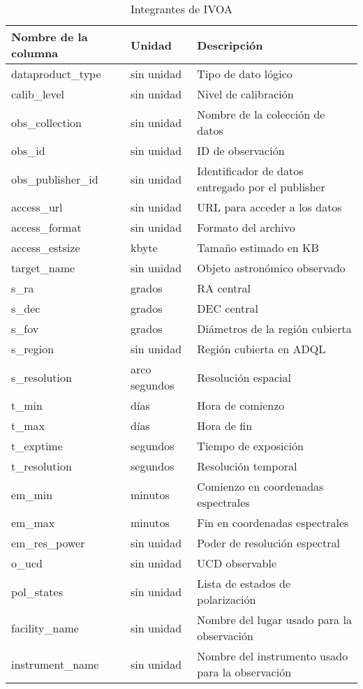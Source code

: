 \begin{table}[h!t]
	\centering
	\caption{Integrantes de IVOA}
	\begin{tabular}{|l|l|l|} 
		\hline
		Nombre de la columna & Unidad & Descripción \\
		\hline
		dataproduct\_type & sin unidad & Tipo de dato lógico \\
		calib\_level & sin unidad & Nivel de calibración \\
		obs\_collection & sin unidad & Nombre de la colección de datos \\
		obs\_id & sin unidad & ID de observación \\
		obs\_publisher\_id & sin unidad & Identificador de datos entregado por el publisher \\
		access\_url & sin unidad & URL para acceder a los datos \\
		access\_format & sin unidad & Formato del archivo \\
		access\_estsize & kbyte & Tamaño estimado en KB \\
		target\_name & sin unidad & Objeto astronómico observado \\
		s\_ra & grados & RA central \\
		s\_dec & grados & DEC central \\
		s\_fov & grados & Diámetros de la región cubierta \\
		s\_region & sin unidad & Región cubierta en ADQL \\
		s\_resolution & arco segundos & Resolución espacial \\
		t\_min & días & Hora de comienzo \\
		t\_max & días & Hora de fin \\
		t\_exptime & segundos & Tiempo de exposición \\
		t\_resolution & segundos & Resolución temporal \\
		em\_min & minutos & Comienzo en coordenadas espectrales \\
		em\_max & minutos & Fin en coordenadas espectrales \\
		em\_res\_power & sin unidad & Poder de resolución espectral \\
		o\_ucd & sin unidad & UCD observable \\
		pol\_states & sin unidad & Lista de estados de polarización \\
		facility\_name & sin unidad & Nombre del lugar usado para la observación \\
		instrument\_name & sin unidad & Nombre del instrumento usado para la observación \\
		\hline
	\end{tabular}
	\label{table:tap_column_name}
\end{table}

